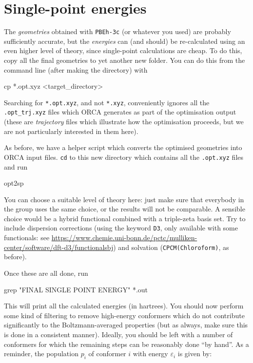 \documentclass[10pt]{article}
\begin{document}
\section{Single-point energies}

The \textit{geometries} obtained with \texttt{PBEh-3c} (or whatever you used) are probably sufficiently accurate, but the \textit{energies} can (and should) be re-calculated using an even higher level of theory, since single-point calculations are cheap. To do this, copy all the final geometries to yet another new folder. You can do this from the command line (after making the directory) with

\begin{cmdline}
cp *.opt.xyz <target_directory>
\end{cmdline}

Searching for \texttt{*.opt.xyz}, and not \texttt{*.xyz}, conveniently ignores all the \texttt{.opt\_trj.xyz} files which ORCA generates as part of the optimisation output (these are \textit{trajectory} files which illustrate how the optimisation proceeds, but we are not particularly interested in them here).

As before, we have a helper script which converts the optimised geometries into ORCA input files. \texttt{cd} to this new directory which contains all the \texttt{.opt.xyz} files and run

\begin{cmdline}
opt2sp
\end{cmdline}

You can choose a suitable level of theory here: just make sure that everybody in the group uses the same choice, or the results will not be comparable. A sensible choice would be a hybrid functional combined with a triple-zeta basis set. Try to include dispersion corrections (using the keyword \texttt{D3}, only available with some functionals: see \url{https://www.chemie.uni-bonn.de/pctc/mulliken-center/software/dft-d3/functionalsbj}) and solvation (\texttt{CPCM(Chloroform)}, as before).

Once these are all done, run

\begin{cmdline}
grep "FINAL SINGLE POINT ENERGY" *.out
\end{cmdline}

This will print all the calculated energies (in hartrees). You should now perform some kind of filtering to remove high-energy conformers which do not contribute significantly to the Boltzmann-averaged properties (but as always, make sure this is done in a consistent manner). Ideally, you should be left with a number of conformers for which the remaining steps can be reasonably done ``by hand''. As a reminder, the population \(p_i\) of conformer \(i\) with energy \(\varepsilon_i\) is given by:
\end{document}
